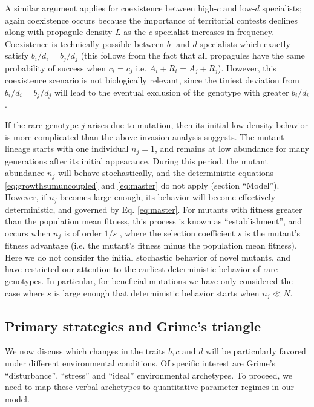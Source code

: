 \documentclass[11pt]{article}
\begin{document}
A similar argument applies for coexistence between high-$c$ and low-$d$ specialists; again coexistence occurs because the importance of territorial contests declines along with propagule density $L$ as the $c$-specialist increases in frequency. Coexistence is technically possible between $b$- and $d$-specialists which exactly satisfy $b_i/d_i=b_j/d_j$ (this follows from the fact that all propagules have the same probability of success when $c_i=c_j$ i.e. $A_i+R_i=A_j+R_j$). However, this coexistence scenario is not biologically relevant, since the tiniest deviation from $b_i/d_i=b_j/d_j$ will lead to the eventual exclusion of the genotype with greater $b_i/d_i$. 

If the rare genotype $j$ arises due to mutation, then its initial low-density behavior is more complicated than the above invasion analysis suggests. The mutant lineage starts with one individual $n_j=1$, and remains at low abundance for many generations after its initial appearance. During this period, the mutant abundance $n_j$ will behave stochastically, and the deterministic equations \eqref{eq:growthsumuncoupled} and \eqref{eq:master} do not apply (section ``Model''). However, if $n_j$ becomes large enough, its behavior will become effectively deterministic, and governed by Eq. \eqref{eq:master}. For mutants with fitness greater than the population mean fitness, this process is known as ``establishment'', and occurs when $n_j$ is of order $1/s$ \citep{desai_2007}, where the selection coefficient $s$ is the mutant's fitness advantage (i.e. the mutant's fitness minus the population mean fitness). Here we do not consider the initial stochastic behavior of novel mutants, and have restricted our attention to the earliest deterministic behavior of rare genotypes. In particular, for beneficial mutations we have only considered the case where $s$ is large enough that deterministic behavior starts when $n_j \ll N$.

\subsection*{Primary strategies and Grime's triangle}

We now discuss which changes in the traits $b, c$ and $d$ will be particularly favored under different environmental conditions. Of specific interest are Grime's ``disturbance'', ``stress'' and ``ideal'' environmental archetypes. To proceed, we need to map these verbal archetypes to quantitative parameter regimes in our model. 
\end{document}
